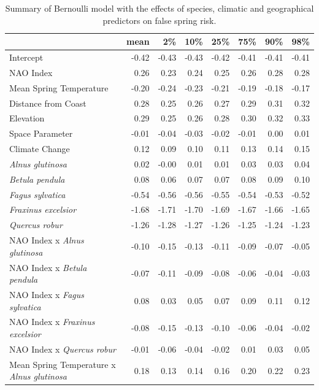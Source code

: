 \documentclass{article}\usepackage[]{graphicx}\usepackage[]{color}
\begin{document}
\newpage
\begin{longtable}{lrrrrrrr}
\caption{Summary of Bernoulli model with the effects of species, climatic and geographical predictors on false spring risk.} \\ 
  \hline
 & mean & 2\% & 10\% & 25\% & 75\% & 90\% & 98\% \\ 
  \hline \endhead  \hline
Intercept & -0.42 & -0.43 & -0.43 & -0.42 & -0.41 & -0.41 & -0.41 \\ 
  NAO Index & 0.26 & 0.23 & 0.24 & 0.25 & 0.26 & 0.28 & 0.28 \\ 
  Mean Spring 
Temperature & -0.20 & -0.24 & -0.23 & -0.21 & -0.19 & -0.18 & -0.17 \\ 
  Distance from 
Coast & 0.28 & 0.25 & 0.26 & 0.27 & 0.29 & 0.31 & 0.32 \\ 
  Elevation & 0.29 & 0.25 & 0.26 & 0.28 & 0.30 & 0.32 & 0.33 \\ 
  Space Parameter & -0.01 & -0.04 & -0.03 & -0.02 & -0.01 & 0.00 & 0.01 \\ 
  Climate Change & 0.12 & 0.09 & 0.10 & 0.11 & 0.13 & 0.14 & 0.15 \\ 
  \textit{Alnus glutinosa} & 0.02 & -0.00 & 0.01 & 0.01 & 0.03 & 0.03 & 0.04 \\ 
  \textit{Betula pendula} & 0.08 & 0.06 & 0.07 & 0.07 & 0.08 & 0.09 & 0.10 \\ 
  \textit{Fagus sylvatica} & -0.54 & -0.56 & -0.56 & -0.55 & -0.54 & -0.53 & -0.52 \\ 
  \textit{Fraxinus excelsior} & -1.68 & -1.71 & -1.70 & -1.69 & -1.67 & -1.66 & -1.65 \\ 
  \textit{Quercus robur} & -1.26 & -1.28 & -1.27 & -1.26 & -1.25 & -1.24 & -1.23 \\ 
  NAO Index
x\textit{ Alnus glutinosa} & -0.10 & -0.15 & -0.13 & -0.11 & -0.09 & -0.07 & -0.05 \\ 
  NAO Index
x\textit{ Betula pendula} & -0.07 & -0.11 & -0.09 & -0.08 & -0.06 & -0.04 & -0.03 \\ 
  NAO Index
x\textit{ Fagus sylvatica} & 0.08 & 0.03 & 0.05 & 0.07 & 0.09 & 0.11 & 0.12 \\ 
  NAO Index
x\textit{ Fraxinus excelsior} & -0.08 & -0.15 & -0.13 & -0.10 & -0.06 & -0.04 & -0.02 \\ 
  NAO Index
x\textit{ Quercus robur} & -0.01 & -0.06 & -0.04 & -0.02 & 0.01 & 0.03 & 0.05 \\ 
  Mean Spring 
Temperature
x\textit{ Alnus glutinosa} & 0.18 & 0.13 & 0.14 & 0.16 & 0.20 & 0.22 & 0.23 \\ 

\end{longtable}
\end{document}
